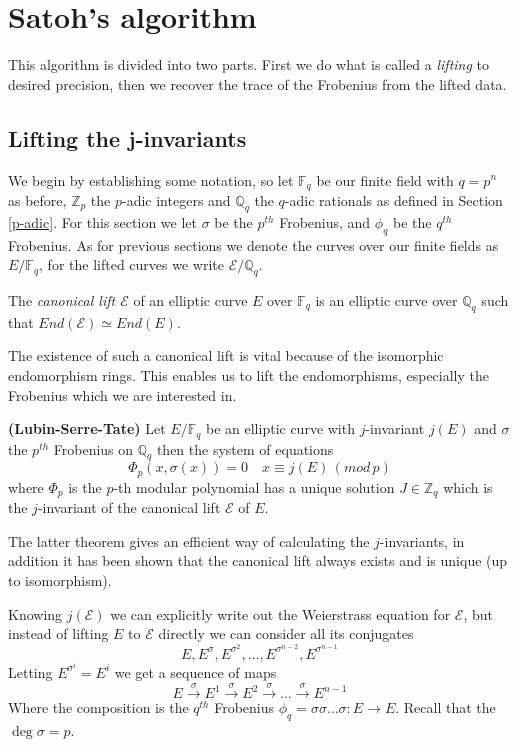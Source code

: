 \section{Satoh's algorithm} \label{satoh}
This algorithm is divided into two parts. First we do what is called a \emph{lifting} to desired
precision, then we recover the trace of the Frobenius from the lifted data.

\subsection{Lifting the j-invariants}
We begin by establishing some notation, so let $\mathbb{F}_q$ be our finite field with $q=p^n$ as before,
$\mathbb{Z}_p$ the $p$-adic integers and $\mathbb{Q}_q$ the $q$-adic rationals as defined in Section \ref{p-adic}.
For this section we let $\sigma$ be the $p^{th}$ Frobenius, and $\phi_q$ be the $q^{th}$ Frobenius.
As for previous sections we denote the curves over our finite fields as $E/\mathbb{F}_q$,
for the lifted curves we write $\mathscr{E}/\mathbb{Q}_q$.

\begin{mydef}
 The \emph{canonical lift $\mathscr{E}$} of an elliptic curve $E$ over $\mathbb{F}_q$ is
an elliptic curve over $\mathbb{Q}_q$ such that $End(\mathscr{E}) \simeq End(E)$.
\end{mydef}

The existence of such a canonical lift is vital because of the isomorphic endomorphism rings. This
enables us to lift the endomorphisms, especially the Frobenius which we are interested in.

\begin{thm}
 \textbf{(Lubin-Serre-Tate)} Let $E/\mathbb{F}_q$ be an elliptic curve with $j$-invariant $j(E)$ and
$\sigma$ the $p^{th}$ Frobenius on $\mathbb{Q}_q$ then the system of equations
$$ \Phi_p(x, \sigma(x)) = 0 \quad x \equiv j(E) \, (mod\, p)$$
where $\Phi_p$ is the $p$-th modular polynomial has a unique solution $J \in \mathbb{Z}_q$ 
which is the $j$-invariant of the canonical lift $\mathscr{E}$ of $E$.
\end{thm}
The latter theorem gives an efficient way of calculating the $j$-invariants, in addition it has
been shown \cite{Deuring} that the canonical lift always exists and is unique (up to isomorphism).

Knowing $j(\mathscr{E})$ we can explicitly write out the Weierstrass equation for $\mathscr{E}$, but
instead of lifting $E$ to $\mathscr{E}$ directly we can consider all its conjugates
$$E, E^\sigma, E^{\sigma^2}, \ldots, E^{\sigma^{n-2}}, E^{\sigma^{n-1}} $$
Letting $E^{\sigma^i} = E^i $ we get a sequence of maps
$$ E \overset{\sigma}{\rightarrow} E^1 \overset{\sigma}{\rightarrow} E^2 \overset{\sigma}{\rightarrow}
\ldots \overset{\sigma}{\rightarrow} E^{n-1} $$
Where the composition is the $q^{th}$ Frobenius $\phi_q = \sigma \sigma \ldots \sigma: E \rightarrow E$.
Recall that the $\deg \sigma = p$.

